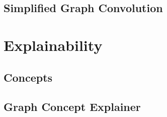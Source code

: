 

\subsection{Simplified Graph Convolution}





\section{Explainability}




\subsection{Concepts}







\subsection{Graph Concept Explainer}


